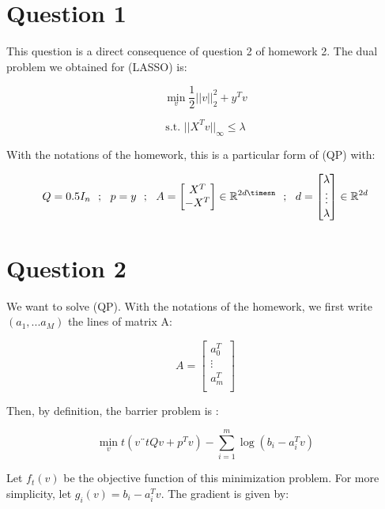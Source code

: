 \documentclass[a4paper]{article}
\begin{document}




\section{Question 1}

This question is a direct consequence of question 2 of homework 2. The dual problem we obtained for (LASSO) is:

$$
\min_v \frac{1}{2}||v||^2_2 + y^Tv
$$

$$
\text{s.t.  } ||X^Tv||_\infty \le \lambda
$$

With the notations of the homework, this is a particular form of (QP) with:

$$
Q = 0.5 I_n \ \ ; \ \
p = y \ \ ; \ \
A = \begin{bmatrix}
    X^T \\
    -X^T \\
\end{bmatrix} \in \mathbb{R}^{2d\timesn} \ \ ; \ \
d = \begin{bmatrix}
    \lambda \\
    \vdots \\
    \lambda
\end{bmatrix} \in \mathbb{R}^{2d}
$$

\section{Question 2}

We want to solve (QP). With the notations of the homework, we first write $(a_1, ... a_M)$ the lines of matrix A:

$$
A = \begin{bmatrix}
    a_0^T \\
    \vdots \\
    a_m^T \\
\end{bmatrix}
$$

Then, by definition, the barrier problem is :

$$
\min_v t(v¨tQv + p^Tv) - \sum_{i=1}^m\log(b_i - a_i^Tv)
$$

Let $f_t(v)$ be the objective function of this minimization problem. For more simplicity, let $g_i(v) = b_i - a_i^Tv$. The gradient is given by:
\end{document}
